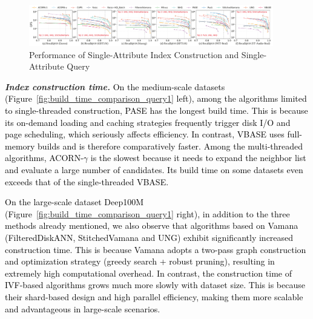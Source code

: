 \documentclass[sigconf, nonacm, pdfa]{acmart}
\begin{document}
{	
	\begin{figure}
		\centering
		\setlength{\abovecaptionskip}{0.15cm}
		\setlength{\belowcaptionskip}{-0.10cm}
		\includegraphics[width=0.95\textwidth]{figures/exp/exp_1_1_SingleLabel_1thread.pdf}
		\caption{Performance of Single-Attribute Index Construction and Single-Attribute Query }
		\label{fig:exp_1_1_SingleLabel_1thread}
	\end{figure}
	
%		
	
\textit{\textbf{Index construction time.}}
\textcolor{black}{On the medium-scale datasets (Figure~\ref{fig:build_time_comparison_query1} left), among the algorithms limited to single-threaded construction, PASE has the longest build time. This is because its on-demand loading and caching strategies frequently trigger disk I/O and page scheduling, which seriously affects efficiency. In contrast, VBASE uses full-memory builds and is therefore comparatively faster. Among the multi-threaded algorithms, ACORN-$\gamma$ is the slowest because it needs to expand the neighbor list and evaluate a large number of candidates. Its build time on some datasets even exceeds that of the single-threaded VBASE. }

\textcolor{black}{On the large-scale dataset Deep100M (Figure~\ref{fig:build_time_comparison_query1} right), in addition to the three methods already mentioned, we also observe that algorithms based on Vamana (FilteredDiskANN, StitchedVamana and UNG) exhibit significantly increased construction time. This is because Vamana adopts a two-pass graph construction and optimization strategy (greedy search + robust pruning), resulting in extremely high computational overhead. In contrast, the construction time of IVF-based algorithms grows much more slowly with dataset size. This is because their shard-based design and high parallel efficiency, making them more scalable and advantageous in large-scale scenarios.}



}
\end{document}
